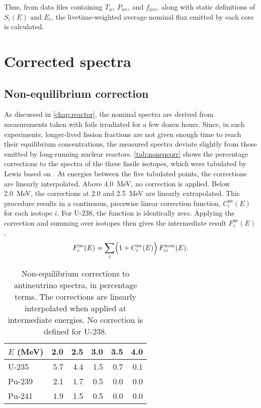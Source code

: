 \documentclass[../thesis.tex]{subfiles}
\begin{document}
Thus, from data files containing $T_w$, $P_{wc}$, and $f_{wci}$, along with
static definitions of $S_i(E)$ and $E_i$, the livetime-weighted average nominal
flux emitted by each core is calculated.

\section{Corrected spectra}
\label{sec:corrspectra}

\subsection{Non-equilibrium correction}
\label{sec:noneqcorrspectra}

As discussed in \autoref{chap:reactor}, the nominal spectra are derived from
measurements taken with foils irradiated for a few dozen hours. Since, in such
experiments, longer-lived fission fractions are not given enough time to reach
their equilibrium concentrations, the measured spectra deviate slightly from
those emitted by long-running nuclear reactors. \autoref{tab:noneqcorr} shows
the percentage corrections to the spectra of the three fissile isotopes, which
were tabulated by Lewis \cite{Lewis} based on \cite{Mueller_2011}. At energies
between the five tabulated points, the corrections are linearly
interpolated. Above 4.0~MeV, no correction is applied. Below 2.0~MeV, the
corrections at 2.0 and 2.5~MeV are linearly extrapolated. This procedure results
in a continuous, piecewise linear correction function, $C^\mathrm{ne}_i(E)$ for
each isotope $i$. For U-238, the function is identically zero. Applying the
correction and summing over isotopes then gives the intermediate result
$F^\mathrm{ne}_c(E)$,
\[ F^\mathrm{ne}_c(E) = \sum_i \Bigl(1 + C^\mathrm{ne}_i(E)\Bigr)\,
  F^\mathrm{nom}_{ci}(E). \]

\begin{table}
  \centering
  \begin{tabular}{lrrrrr}
    \toprule
    $E$ (MeV) & 2.0 & 2.5 & 3.0 & 3.5 & 4.0 \\
    \midrule
    U-235 & 5.7 & 4.4 & 1.5 & 0.7 & 0.1 \\
    Pu-239 & 2.1 & 1.7 & 0.5 & 0.0 & 0.0 \\
    Pu-241 & 1.9 & 1.5 & 0.5 & 0.0 & 0.0 \\
    \bottomrule
  \end{tabular}
  \caption{Non-equilibrium corrections to antineutrino spectra, in percentage
    terms. The corrections are linearly interpolated when applied at
    intermediate energies. No correction is defined for U-238.}
  \label{tab:noneqcorr}
\end{table}
\end{document}
